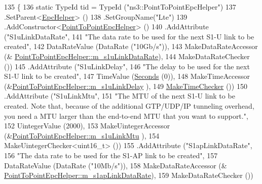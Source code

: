 \begin{DoxyCode}
135 \{
136   \textcolor{keyword}{static} TypeId tid = TypeId (\textcolor{stringliteral}{"ns3::PointToPointEpcHelper"})
137     .SetParent<\hyperlink{classns3_1_1EpcHelper_a419929e12a2c6273eb48cb766064436b}{EpcHelper}> ()
138     .SetGroupName(\textcolor{stringliteral}{"Lte"})
139     .AddConstructor<\hyperlink{classns3_1_1PointToPointEpcHelper_a3d4c34f6a194c994d45e0dac5019b8cb}{PointToPointEpcHelper}> ()
140     .AddAttribute (\textcolor{stringliteral}{"S1uLinkDataRate"}, 
141                    \textcolor{stringliteral}{"The data rate to be used for the next S1-U link to be created"},
142                    DataRateValue (DataRate (\textcolor{stringliteral}{"10Gb/s"})),
143                    MakeDataRateAccessor (&
      \hyperlink{classns3_1_1PointToPointEpcHelper_a0fab7f53e1e32ea56de65de870135ad1}{PointToPointEpcHelper::m\_s1uLinkDataRate}),
144                    MakeDataRateChecker ())
145     .AddAttribute (\textcolor{stringliteral}{"S1uLinkDelay"}, 
146                    \textcolor{stringliteral}{"The delay to be used for the next S1-U link to be created"},
147                    TimeValue (\hyperlink{group__timecivil_ga33c34b816f8ff6628e33d5c8e9713b9e}{Seconds} (0)),
148                    MakeTimeAccessor (&\hyperlink{classns3_1_1PointToPointEpcHelper_ab89c8a8ac200c9a7f57a86c41f8d23c2}{PointToPointEpcHelper::m\_s1uLinkDelay}
      ),
149                    \hyperlink{group__time_ga7032965bd4afa578691d88c09e4481c1}{MakeTimeChecker} ())
150     .AddAttribute (\textcolor{stringliteral}{"S1uLinkMtu"}, 
151                    \textcolor{stringliteral}{"The MTU of the next S1-U link to be created. Note that, because of the additional
       GTP/UDP/IP tunneling overhead, you need a MTU larger than the end-to-end MTU that you want to support."},
152                    UintegerValue (2000),
153                    MakeUintegerAccessor (&\hyperlink{classns3_1_1PointToPointEpcHelper_a3d643e8da4aafa252b79b17246d12a7e}{PointToPointEpcHelper::m\_s1uLinkMtu}
      ),
154                    MakeUintegerChecker<uint16\_t> ())
155     .AddAttribute (\textcolor{stringliteral}{"S1apLinkDataRate"}, 
156                    \textcolor{stringliteral}{"The data rate to be used for the S1-AP link to be created"},
157                    DataRateValue (DataRate (\textcolor{stringliteral}{"10Mb/s"})),
158                    MakeDataRateAccessor (&
      \hyperlink{classns3_1_1PointToPointEpcHelper_a732626ace34876e4846d9d86b191100c}{PointToPointEpcHelper::m\_s1apLinkDataRate}),
159                    MakeDataRateChecker ())

\end{DoxyCode}
